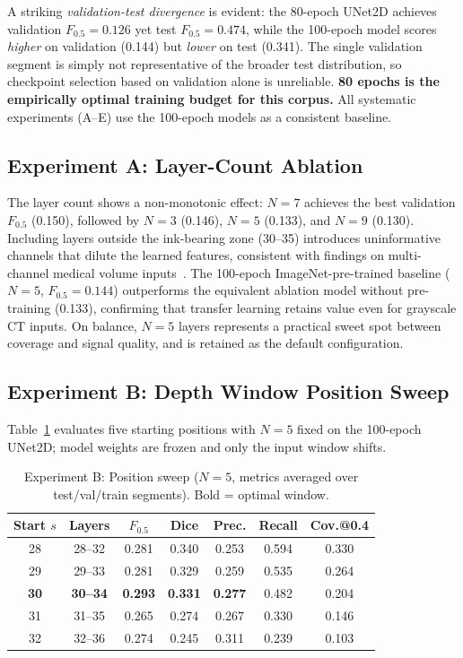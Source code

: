 A striking \emph{validation-test divergence} is evident: the 80-epoch UNet2D achieves validation $F_{0.5} = 0.126$ yet test $F_{0.5} = 0.474$, while the 100-epoch model scores \emph{higher} on validation (0.144) but \emph{lower} on test (0.341). The single validation segment is simply not representative of the broader test distribution, so checkpoint selection based on validation alone is unreliable. \textbf{80 epochs is the empirically optimal training budget for this corpus.} All systematic experiments (A--E) use the 100-epoch models as a consistent baseline.

\subsection{Experiment A: Layer-Count Ablation}

The layer count shows a non-monotonic effect: $N = 7$ achieves the best validation $F_{0.5}$ (0.150), followed by $N = 3$ (0.146), $N = 5$ (0.133), and $N = 9$ (0.130). Including layers outside the ink-bearing zone (30--35) introduces uninformative channels that dilute the learned features, consistent with findings on multi-channel medical volume inputs~\cite{roth2014new}. The 100-epoch ImageNet-pre-trained baseline ($N = 5$, $F_{0.5} = 0.144$) outperforms the equivalent ablation model without pre-training (0.133), confirming that transfer learning retains value even for grayscale CT inputs. On balance, $N = 5$ layers represents a practical sweet spot between coverage and signal quality, and is retained as the default configuration.

\subsection{Experiment B: Depth Window Position Sweep}

Table~\ref{tab:exp_b} evaluates five starting positions with $N = 5$ fixed on the 100-epoch UNet2D; model weights are frozen and only the input window shifts.

\begin{table}[h]
\centering
\caption{Experiment B: Position sweep ($N = 5$, metrics averaged over test/val/train segments). Bold = optimal window.}
\label{tab:exp_b}
\begin{tabular}{ccccccc}
\hline
Start $s$ & Layers & $F_{0.5}$ & Dice & Prec. & Recall & Cov.@0.4 \\
\hline
28 & 28--32 & 0.281 & 0.340 & 0.253 & 0.594 & 0.330 \\
29 & 29--33 & 0.281 & 0.329 & 0.259 & 0.535 & 0.264 \\
\textbf{30} & \textbf{30--34} & \textbf{0.293} & \textbf{0.331} & \textbf{0.277} & 0.482 & 0.204 \\
31 & 31--35 & 0.265 & 0.274 & 0.267 & 0.330 & 0.146 \\
32 & 32--36 & 0.274 & 0.245 & 0.311 & 0.239 & 0.103 \\
\hline
\end{tabular}
\end{table}

